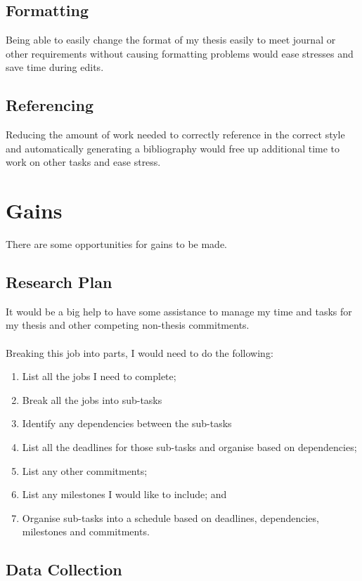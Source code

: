 \documentclass{article}
\begin{document}
\subsection*{Formatting}
Being able to easily change the format of my thesis easily to meet journal or other requirements without causing formatting problems would ease stresses and save time during edits.
\subsection*{Referencing}
Reducing the amount of work needed to correctly reference in the correct style and automatically generating a bibliography would free up additional time to work on other tasks and ease stress.\par

\section*{Gains}

There are some opportunities for gains to be made.
\subsection*{Research Plan}

It would be a big help to have some assistance to manage my time and tasks for my thesis and other competing non-thesis commitments.\\\\
Breaking this job into parts, I would need to do the following:
\begin{enumerate}
\item List all the jobs I need to complete;
\item Break all the jobs into sub-tasks
\item Identify any dependencies between the sub-tasks
\item List all the deadlines for those sub-tasks and organise based on dependencies;
\item List any other commitments;
\item List any milestones I would like to include; and
\item Organise sub-tasks into a schedule based on deadlines, dependencies, milestones and commitments.
\end{enumerate}


\subsection*{Data Collection}
\end{document}

